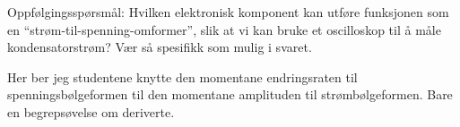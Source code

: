 \vskip 10pt

Oppfølgingsspørsmål: Hvilken elektronisk komponent kan utføre funksjonen som en ``strøm-til-spenning-omformer'', slik at vi kan bruke et oscilloskop til å måle kondensatorstrøm? Vær så spesifikk som mulig i svaret.







Her ber jeg studentene knytte den momentane endringsraten til spenningsbølgeformen til den momentane amplituden til strømbølgeformen. Bare en begrepsøvelse om deriverte.



